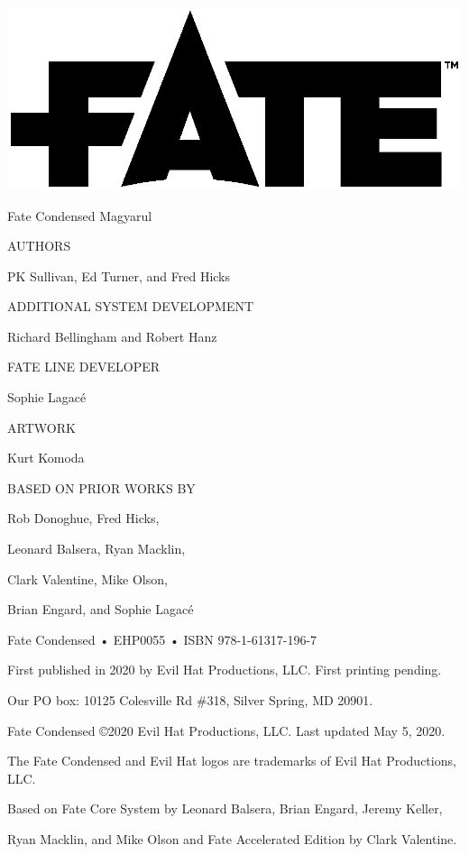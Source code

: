 \begin{center}

\includegraphics[trim= 0cm 4cm 0cm 2cm]{fate logo.eps}

{\RobotoCondensed\Huge\MakeUppercase Fate Condensed Magyarul}

\vspace{2em}

AUTHORS

PK Sullivan, Ed Turner, and Fred Hicks

ADDITIONAL SYSTEM DEVELOPMENT

Richard Bellingham and Robert Hanz

FATE LINE DEVELOPER

Sophie Lagacé

ARTWORK

Kurt Komoda

BASED ON PRIOR WORKS BY

Rob Donoghue, Fred Hicks,

Leonard Balsera, Ryan Macklin,

Clark Valentine, Mike Olson,

Brian Engard, and Sophie Lagacé

\vspace{2em}

Fate Condensed • EHP0055 • ISBN 978-1-61317-196-7

First published in 2020 by Evil Hat Productions, LLC. First printing pending.

Our PO box: 10125 Colesville Rd \#318, Silver Spring, MD 20901.

Fate Condensed ©2020 Evil Hat Productions, LLC. Last updated May 5, 2020.

The Fate Condensed and Evil Hat logos are trademarks of Evil Hat Productions, LLC.

Based on Fate Core System by Leonard Balsera, Brian Engard, Jeremy Keller,

Ryan Macklin, and Mike Olson and Fate Accelerated Edition by Clark Valentine.


\end{center}
